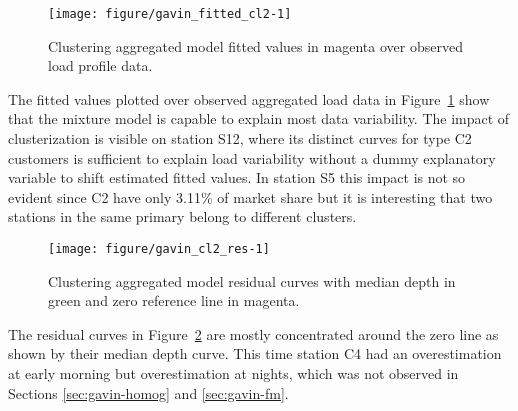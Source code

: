 \begin{figure}[t]
  \centering
\begin{knitrout}
\color{fgcolor}
\texttt{[image: figure/gavin\_fitted\_cl2-1]} 

\end{knitrout}
  \caption{Clustering aggregated model fitted values in magenta over observed load profile data.}
  \label{fig:gavin-cl2-fitted}
\end{figure}

The fitted values plotted over observed  aggregated load data in Figure~\ref{fig:gavin-cl2-fitted} show that the mixture model is capable to explain  most data variability. The impact of clusterization is visible on station S12, where its distinct curves for type C2 customers is sufficient to explain load variability without a dummy explanatory variable to shift estimated fitted values. In station S5 this impact is not so evident since C2 have only 3.11\% of market share but it is interesting that two stations in the same primary belong to different clusters.


\begin{figure}[t]
  \centering
\begin{knitrout}
\color{fgcolor}
\texttt{[image: figure/gavin\_cl2\_res-1]} 

\end{knitrout}
  \caption{Clustering aggregated model residual curves with median depth in green and zero reference line in magenta.}
  \label{fig:gavin-cl2-res}
\end{figure}


The residual curves in Figure~\ref{fig:gavin-cl2-res} are mostly concentrated around the zero line as shown by their median depth curve. This time station C4 had an overestimation at early morning but overestimation at nights, which was not observed in Sections \ref{sec:gavin-homog} and \ref{sec:gavin-fm}.

 


